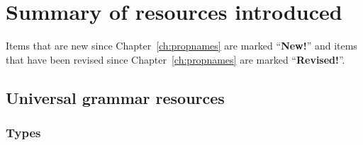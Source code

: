             
              



\section{Summary of resources introduced}
\label{sec:summresch5}


Items that are new since Chapter~\ref{ch:propnames} are marked
``\textbf{New!}'' and items that have been revised since
Chapter~\ref{ch:propnames} are marked ``\textbf{Revised!}''.  %

\subsection{Universal grammar resources} 

\subsubsection{Types} 

